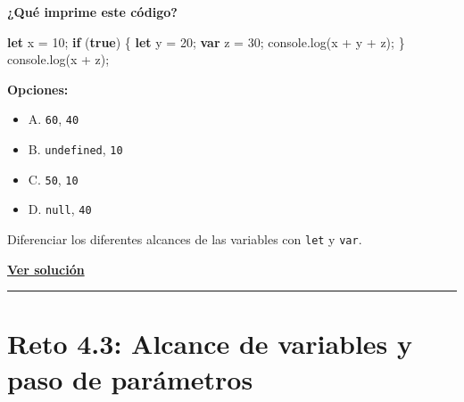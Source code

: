 \documentclass[
  letterpaper,
  DIV=11,
  numbers=noendperiod]{scrreprt}
\newenvironment{Shaded}{\begin{snugshade}}{\end{snugshade}}
\newcommand{\BuiltInTok}[1]{\textcolor[rgb]{0.00,0.23,0.31}{#1}}
\newcommand{\ControlFlowTok}[1]{\textcolor[rgb]{0.00,0.23,0.31}{\textbf{#1}}}
\newcommand{\DecValTok}[1]{\textcolor[rgb]{0.68,0.00,0.00}{#1}}
\newcommand{\FunctionTok}[1]{\textcolor[rgb]{0.28,0.35,0.67}{#1}}
\newcommand{\KeywordTok}[1]{\textcolor[rgb]{0.00,0.23,0.31}{\textbf{#1}}}
\newcommand{\NormalTok}[1]{\textcolor[rgb]{0.00,0.23,0.31}{#1}}
\newcommand{\OperatorTok}[1]{\textcolor[rgb]{0.37,0.37,0.37}{#1}}
\providecommand{\tightlist}{%
  \setlength{\itemsep}{0pt}\setlength{\parskip}{0pt}}
\begin{document}
\textbf{¿Qué imprime este código?}

\begin{Shaded}
\begin{Highlighting}[]
\KeywordTok{let}\NormalTok{ x }\OperatorTok{=} \DecValTok{10}\OperatorTok{;}
\ControlFlowTok{if}\NormalTok{ (}\KeywordTok{true}\NormalTok{) \{}
  \KeywordTok{let}\NormalTok{ y }\OperatorTok{=} \DecValTok{20}\OperatorTok{;}
  \KeywordTok{var}\NormalTok{ z }\OperatorTok{=} \DecValTok{30}\OperatorTok{;}
  \BuiltInTok{console}\OperatorTok{.}\FunctionTok{log}\NormalTok{(x }\OperatorTok{+}\NormalTok{ y }\OperatorTok{+}\NormalTok{ z)}\OperatorTok{;}
\NormalTok{\}}
\BuiltInTok{console}\OperatorTok{.}\FunctionTok{log}\NormalTok{(x }\OperatorTok{+}\NormalTok{ z)}\OperatorTok{;}
\end{Highlighting}
\end{Shaded}

\textbf{Opciones:}

\begin{itemize}
\tightlist
\item
  A. \texttt{60}, \texttt{40}
\item
  B. \texttt{undefined}, \texttt{10}
\item
  C. \texttt{50}, \texttt{10}
\item
  D. \texttt{null}, \texttt{40}
\end{itemize}

\begin{tcolorbox}[enhanced jigsaw, left=2mm, toprule=.15mm, leftrule=.75mm, breakable, colback=white, coltitle=black, bottomtitle=1mm, arc=.35mm, rightrule=.15mm, colframe=quarto-callout-tip-color-frame, opacitybacktitle=0.6, toptitle=1mm, opacityback=0, titlerule=0mm, title=\textcolor{quarto-callout-tip-color}{\faLightbulb}\hspace{0.5em}{Pista}, bottomrule=.15mm, colbacktitle=quarto-callout-tip-color!10!white]

Diferenciar los diferentes alcances de las variables con \texttt{let} y
\texttt{var}.

\end{tcolorbox}

\textbf{\hyperref[sec-sol-cap4-reto2]{Ver solución}}

\begin{center}\rule{0.5\linewidth}{0.5pt}\end{center}

\section{Reto 4.3: Alcance de variables y paso de
parámetros}\label{sec-cap4-reto3}
\end{document}
